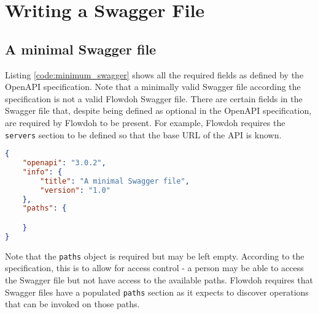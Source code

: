 \section{Writing a Swagger File}
\subsection{A minimal Swagger file}
Listing \ref{code:minimum_swagger} shows all the required fields as defined by the OpenAPI specification. Note that a minimally valid Swagger file according the specification is not a valid Flowdoh Swagger file. There are certain fields in the Swagger file that, despite being defined as optional in the OpenAPI specification, are required by Flowdoh to be present. For example, Flowdoh requires the \texttt{servers} section to be defined so that the base URL of the API is known.\\
\begin{minipage}{\textwidth}
\begin{lstlisting}[caption={A minimal OpenAPI 3.0 definition},label={code:minimum_swagger},language=json]
{
    "openapi": "3.0.2",
    "info": {
        "title": "A minimal Swagger file",
        "version": "1.0"
    },
    "paths": {

    }
}
\end{lstlisting}
\end{minipage}
Note that the \texttt{paths} object is required but may be left empty. According to the specification, this is to allow for access control \cite{emptypaths} - a person may be able to access the Swagger file but not have access to the available paths. Flowdoh requires that Swagger files have a populated \texttt{paths} section as it expects to discover operations that can be invoked on those paths.
